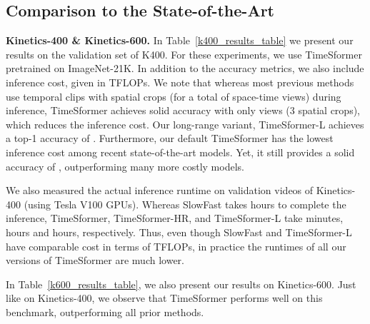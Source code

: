\documentclass{article}
\begin{document}
\subsection{Comparison to the State-of-the-Art}
\label{sota_sec}














\textbf{Kinetics-400 \& Kinetics-600.} In Table~\ref{k400_results_table} we present our results on the validation set of K400. For these experiments, we use TimeSformer pretrained on ImageNet-21K. In addition to the accuracy metrics, we also include inference cost, given in TFLOPs. We note that whereas most previous methods use  temporal clips with  spatial crops (for a total of  space-time views) during inference, TimeSformer achieves solid accuracy with only  views (3 spatial crops), which reduces the inference cost. Our long-range variant, TimeSformer-L achieves a top-1 accuracy of . Furthermore, our default TimeSformer has the lowest inference cost among recent state-of-the-art models. Yet, it still provides a solid accuracy of , outperforming many more costly models. 

We also measured the actual inference runtime on  validation videos of Kinetics-400 (using  Tesla V100 GPUs). Whereas SlowFast takes  hours to complete the inference, TimeSformer, TimeSformer-HR, and TimeSformer-L take  minutes,  hours and  hours, respectively. Thus, even though SlowFast and TimeSformer-L have comparable cost in terms of TFLOPs, in practice the runtimes of all our versions of TimeSformer are much lower. 

In Table~\ref{k600_results_table}, we also present our results on Kinetics-600. Just like on Kinetics-400, we observe that TimeSformer performs well on this benchmark, outperforming all prior methods.







 
\end{document}

